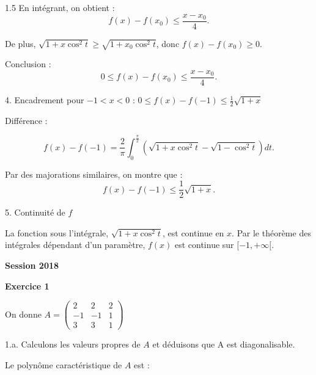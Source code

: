 \documentclass[12pt]{article}
\begin{document}
\begin{spacing}{1.5}
En intégrant, on obtient :
\[
f(x) - f(x_0) \leq \frac{x - x_0}{4}.
\]

De plus, \( \sqrt{1 + x \cos^2 t} \geq \sqrt{1 + x_0 \cos^2 t} \), donc \( f(x) - f(x_0) \geq 0 \).

Conclusion :
\[
0 \leq f(x) - f(x_0) \leq \frac{x - x_0}{4}.
\]


4. Encadrement pour $-1 < x < 0$ : $0 \leq f(x) - f(-1) \leq \frac{1}{2}\sqrt{1+x}$

Différence :

\[
f(x) - f(-1) = \frac{2}{\pi} \int_{0}^{\frac{\pi}{2}} \left( \sqrt{1 + x \cos^2 t} - \sqrt{1 - \cos^2 t} \right) dt.
\]

Par des majorations similaires, on montre que :
\[
f(x) - f(-1) \leq \frac{1}{2} \sqrt{1+x}.
\]

5. Continuité de $f$

La fonction sous l'intégrale, $\sqrt{1 + x \cos^2 t}$, est continue en $x$.  
Par le théorème des intégrales dépendant d'un paramètre, $f(x)$ est continue sur $[-1, +\infty[$.






\medskip\textbf{Session 2018}

\medskip
\textbf{Exercice 1}

On donne $A=\begin{pmatrix}
2 & 2& 2 \\ 
-1 & -1 & 1 \\ 
3 & 3 & 1
\end{pmatrix} $

1.a. Calculons les valeurs propres de $A$ et déduisons que A est diagonalisable.

Le polynôme caractéristique de $A$ est :


\end{spacing}
\end{document}
